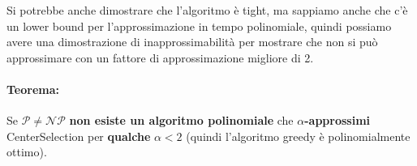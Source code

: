 \documentclass[11pt]{article}
\begin{document}
	Si potrebbe anche dimostrare che l'algoritmo è tight, ma sappiamo anche che c'è un lower bound per l'approssimazione in tempo polinomiale, quindi possiamo avere una dimostrazione di inapprossimabilità per mostrare che non si può approssimare con un fattore di approssimazione migliore di 2.\\
	
	\newpage
	
	\paragraph{Teorema:} Se $\mathcal{P} \neq \mathcal{NP}$ \textbf{non esiste un algoritmo polinomiale} che \textbf{$\alpha$-approssimi} CenterSelection per \textbf{qualche} $\alpha < 2$ (quindi l'algoritmo greedy è polinomialmente ottimo).\\
	
\end{document}
